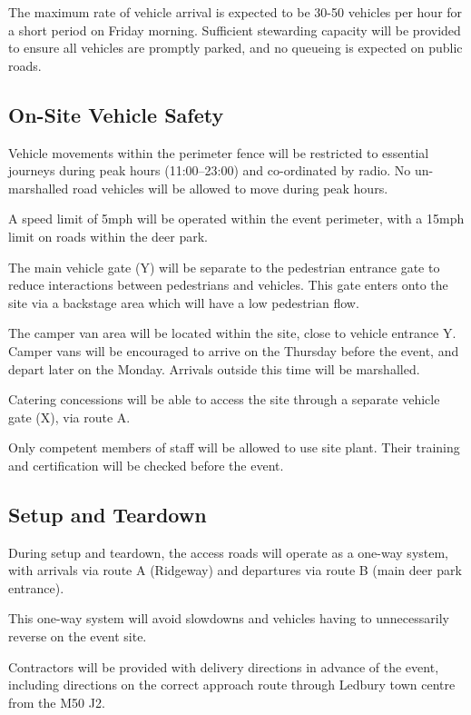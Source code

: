 The maximum rate of vehicle arrival is expected to be 30-50 vehicles per hour
for a short period on Friday morning. Sufficient stewarding capacity will be
provided to ensure all vehicles are promptly parked, and no queueing is expected
on public roads.

\subsection{On-Site Vehicle Safety}\label{vehiclesafety}

Vehicle movements within the perimeter fence will be restricted to essential
journeys during peak hours (11:00--23:00) and co-ordinated by radio. No
un-marshalled road vehicles will be allowed to move during peak hours.

A speed limit of 5mph will be operated within the event perimeter, with a 15mph
limit on roads within the deer park.

The main vehicle gate (Y) will be separate to the pedestrian entrance gate
to reduce interactions between pedestrians and vehicles. This gate enters
onto the site via a backstage area which will have a low pedestrian flow.

The camper van area will be located within the site, close to vehicle
entrance Y. Camper vans will be encouraged to arrive on the Thursday before
the event, and depart later on the Monday. Arrivals outside this time will be
marshalled.

Catering concessions will be able to access the site through a separate
vehicle gate (X), via route A.

Only competent members of staff will be allowed to use site plant. Their
training and certification will be checked before the event.

\subsection{Setup and Teardown}
During setup and teardown, the access roads will operate as
a one-way system, with arrivals via route A (Ridgeway) and departures via
route B (main deer park entrance).

This one-way system will avoid slowdowns and vehicles having to unnecessarily
reverse on the event site.

Contractors will be provided with delivery directions in advance of the event,
including directions on the correct approach route through Ledbury town centre
from the M50 J2.

\newpage

